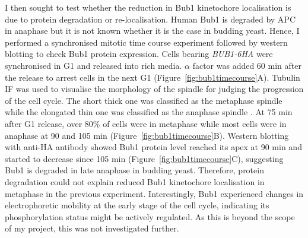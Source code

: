 I then sought to test whether the reduction in Bub1 kinetochore localisation is due to protein degradation or re-localisation. Human Bub1 is degraded by APC in anaphase \citep{Qi2007KEN-box-dependentComplex/cyclosome} but it is not known whether it is the case in budding yeast. Hence, I performed a synchronised mitotic time course experiment followed by western blotting to check Bub1 protein expression. Cells bearing \textit{BUB1-6HA} were synchronised in G1 and released into rich media. $\alpha$ factor was added 60 \si{\minute} after the release to arrest cells in the next G1 (Figure~\ref{fig:bub1timecourse}A). Tubulin IF was used to visualise the morphology of the spindle for judging the progression of the cell cycle. The short thick one was classified as the metaphase spindle while the elongated thin one was classified as the anaphase spindle \citep{Su2021SumoylationAnaphase}. At 75 \si{\minute} after G1 release, over 80\% of cells were in metaphase while most cells were in anaphase at 90 and 105 \si{\minute} (Figure~\ref{fig:bub1timecourse}B). Western blotting with anti-HA antibody showed Bub1 protein level reached its apex at 90 \si{\minute} and started to decrease since 105 \si{\minute} (Figure~\ref{fig:bub1timecourse}C), suggesting Bub1 is degraded in late anaphase in budding yeast. Therefore, protein degradation could not explain reduced Bub1 kinetochore localisation in metaphase in the previous experiment. Interestingly, Bub1 experienced changes in electrophoretic mobility at the early stage of the cell cycle, indicating its phosphorylation status might be actively regulated. As this is beyond the scope of my project, this was not investigated further. 

